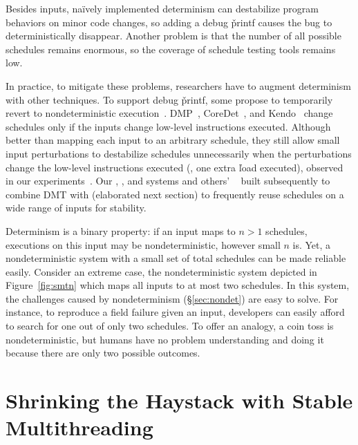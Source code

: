 Besides inputs, na\"{i}vely implemented determinism can destabilize
program behaviors on minor code changes, so adding a debug \v{printf}
causes the bug to deterministically disappear.  Another problem is that
the number of all possible schedules remains enormous, so the coverage of
schedule testing tools remains low.

In practice, to mitigate these problems, researchers have to augment
determinism with other techniques.  To support debug \v{printf}, some
propose to temporarily revert to nondeterministic
execution~\cite{dmp:asplos09}.  DMP~\cite{dmp:asplos09},
CoreDet~\cite{coredet:asplos10}, and Kendo~\cite{kendo:asplos09} change
schedules only if the inputs change low-level instructions executed.
Although better than mapping each input to an arbitrary schedule, they
still allow small input perturbations to destabilize schedules
unnecessarily when the perturbations change the low-level instructions
executed (\eg, one extra \v{load} executed), observed in our
experiments~\cite{cui:tern:osdi10}. Our \tern, \peregrine, and \parrot systems and others'
\dthreads~\cite{dthreads:sosp11} built subsequently to \tern combine DMT
with \smt (elaborated next section) to frequently reuse schedules on a
wide range of inputs for stability.

 Determinism
is a binary property: if
an input maps to $n > 1$ schedules, executions on this input may be
nondeterministic, however small $n$ is.  Yet, a nondeterministic system
with a small set of total schedules can be made reliable easily.  Consider an
extreme case, the nondeterministic system depicted in
Figure~\ref{fig:smtn} which maps all inputs to at most two schedules.  In this
system, the challenges caused by nondeterminism (\S\ref{sec:nondet}) are
easy to solve.  For instance, to reproduce a field failure given an input,
developers can easily afford to search for one out of only two schedules.
To offer an analogy, a coin toss is nondeterministic, but humans have
no problem understanding and doing it because there are only two possible
outcomes.


\section{Shrinking the Haystack with Stable Multithreading} \label{sec:smt}

